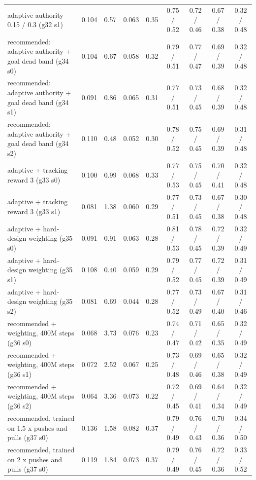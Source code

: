\begin{table}[t]
{\begin{tabular}{p{4.2cm}cccccccc}
adaptive authority 0.15 / 0.3 (g32 s1) & 0.104 & 0.57 & 0.063 & 0.35 & 0.75 / 0.52 & 0.72 / 0.46 & 0.67 / 0.38 & 0.32 / 0.48\\
recommended: adaptive authority + goal dead band (g34 s0) & 0.104 & 0.67 & 0.058 & 0.32 & 0.79 / 0.51 & 0.77 / 0.47 & 0.69 / 0.39 & 0.32 / 0.48\\
recommended: adaptive authority + goal dead band (g34 s1) & 0.091 & 0.86 & 0.065 & 0.31 & 0.77 / 0.51 & 0.73 / 0.45 & 0.68 / 0.39 & 0.32 / 0.48\\
recommended: adaptive authority + goal dead band (g34 s2) & 0.110 & 0.48 & 0.052 & 0.30 & 0.78 / 0.52 & 0.75 / 0.45 & 0.69 / 0.39 & 0.31 / 0.48\\
adaptive + tracking reward 3 (g33 s0) & 0.100 & 0.99 & 0.068 & 0.33 & 0.77 / 0.53 & 0.75 / 0.45 & 0.70 / 0.41 & 0.32 / 0.48\\
adaptive + tracking reward 3 (g33 s1) & 0.081 & 1.38 & 0.060 & 0.29 & 0.77 / 0.51 & 0.73 / 0.45 & 0.67 / 0.38 & 0.30 / 0.48\\
adaptive + hard-design weighting (g35 s0) & 0.091 & 0.91 & 0.063 & 0.28 & 0.81 / 0.53 & 0.78 / 0.45 & 0.72 / 0.39 & 0.32 / 0.49\\
adaptive + hard-design weighting (g35 s1) & 0.108 & 0.40 & 0.059 & 0.29 & 0.79 / 0.52 & 0.77 / 0.45 & 0.72 / 0.39 & 0.31 / 0.49\\
adaptive + hard-design weighting (g35 s2) & 0.081 & 0.69 & 0.044 & 0.28 & 0.77 / 0.52 & 0.73 / 0.49 & 0.67 / 0.40 & 0.31 / 0.46\\
recommended + weighting, 400M steps (g36 s0) & 0.068 & 3.73 & 0.076 & 0.23 & 0.74 / 0.47 & 0.71 / 0.42 & 0.65 / 0.35 & 0.32 / 0.49\\
recommended + weighting, 400M steps (g36 s1) & 0.072 & 2.52 & 0.067 & 0.25 & 0.73 / 0.48 & 0.69 / 0.46 & 0.65 / 0.38 & 0.32 / 0.49\\
recommended + weighting, 400M steps (g36 s2) & 0.064 & 3.36 & 0.073 & 0.22 & 0.72 / 0.45 & 0.69 / 0.41 & 0.64 / 0.34 & 0.32 / 0.49\\
recommended, trained on 1.5 x pushes and pulls (g37 s0) & 0.136 & 1.58 & 0.082 & 0.37 & 0.79 / 0.49 & 0.76 / 0.43 & 0.70 / 0.36 & 0.34 / 0.50\\
recommended, trained on 2 x pushes and pulls (g37 s0) & 0.119 & 1.84 & 0.073 & 0.37 & 0.79 / 0.49 & 0.76 / 0.45 & 0.72 / 0.36 & 0.33 / 0.52\\
\bottomrule\end{tabular}}
\end{table}
